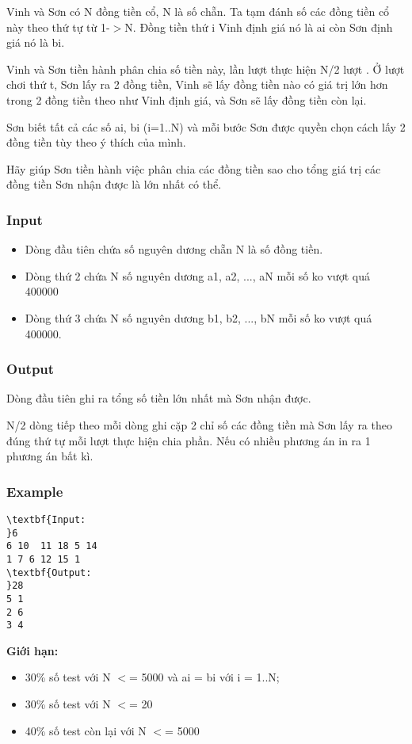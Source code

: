 

Vinh và Sơn có N đồng tiền cổ, N là số chẵn. Ta tạm đánh số các đồng tiền cổ này theo thứ tự từ 1-$>$N. Đồng tiền thứ i Vinh định giá nó là ai còn Sơn định giá nó là bi.

Vinh và Sơn tiền hành phân chia số tiền này, lần lượt thực hiện N/2 lượt . Ở lượt chơi thứ t, Sơn lấy ra 2 đồng tiền, Vinh sẽ lấy đồng tiền nào có giá trị lớn hơn trong 2 đồng tiền theo như Vinh định giá, và Sơn sẽ lấy đồng tiền còn lại.

Sơn biết tất cả các số ai, bi (i=1..N) và mỗi bước Sơn được quyền chọn cách lấy 2 đồng tiền tùy theo ý thích của mình.

Hãy giúp Sơn tiền hành việc phân chia các đồng tiền sao cho tổng giá trị các đồng tiền Sơn nhận được là lớn nhất có thể.

\subsubsection{Input}
\begin{itemize}
	\item Dòng đầu tiên chứa số nguyên dương chẵn N là số đồng tiền.
	\item Dòng thứ 2 chứa N số nguyên dương a1, a2, ..., aN mỗi số ko vượt quá 400000
	\item Dòng thứ 3 chứa N số nguyên dương b1, b2, ..., bN mỗi số ko vượt quá 400000.
\end{itemize}

\subsubsection{Output}

Dòng đầu tiên ghi ra tổng số tiền lớn nhất mà Sơn nhận được.

N/2 dòng tiếp theo mỗi dòng ghi cặp 2 chỉ số các đồng tiền mà Sơn lấy ra theo đúng thứ tự mỗi lượt thực hiện chia phần. Nếu có nhiều phương án in ra 1 phương án bất kì.

\subsubsection{Example}
\begin{verbatim}
\textbf{Input:
}6
6 10  11 18 5 14
1 7 6 12 15 1
\textbf{Output:
}28
5 1
2 6
3 4
\end{verbatim}

\textbf{Giới hạn:}
\begin{itemize}
	\item 30\% số test với N $<$= 5000 và ai = bi với i = 1..N;
	\item 30\% số test với N $<$= 20
	\item 40\% số test còn lại với N $<$= 5000 
\end{itemize}